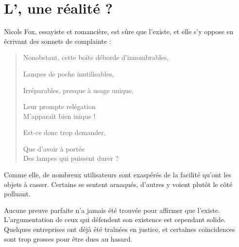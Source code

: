 \section{L'\op, une réalité ?}

Nicols Fox, essayiste et romancière, est sûre que l'\op existe, et elle s'y oppose en écrivant des sonnets de complainte : 
\itshape\begin{center}
\begin{verse}
Nonobstant, cette boîte déborde d'innombrables,

Lampes de poche inutilisables,

Irréparables, presque à usage unique,

Leur prompte relégation\\
M’apparaît bien inique !

Est-ce donc trop demander,

Que d'avoir à portée\\
Des lampes qui puissent durer ?
\end{verse}
\end{center}
\normalfont
Comme elle, de nombreux utilisateurs sont exaspérés de la facilité qu'ont les objets à casser. Certains se sentent arnaqués, d'autres y voient plutôt le côté polluant. 

\bigbreak

Aucune preuve parfaite n'a jamais été trouvée pour affirmer que l'\op existe. L'argumentation de ceux qui défendent son existence est cependant solide. Quelques entreprises ont déjà été traînées en justice, et certaines coïncidences sont trop grosses pour être dues au hasard.